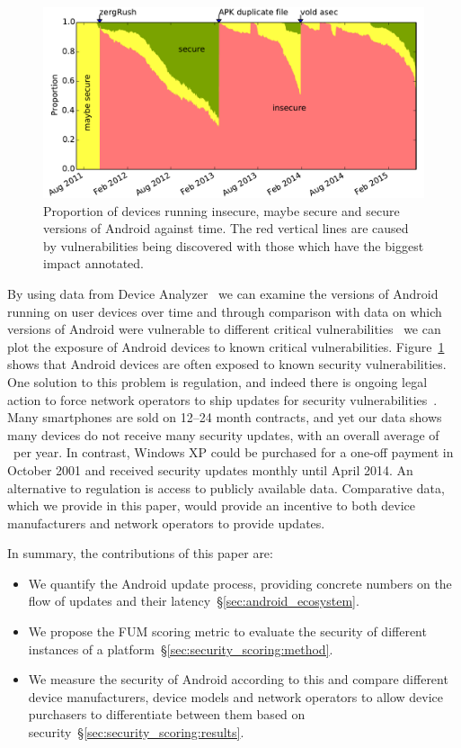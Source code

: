 \documentclass{sig-alternate}
\let\OldTodo\todo
\renewcommand{\todo}{\OldTodo[inline]}
\newcommand{\todolater}[1]{}%
\newcommand{\da}{Device Analyzer}
\begin{document}
\begin{figure}
\centering
\includegraphics[width=\columnwidth]{figures/proportioninsecure}
\caption{Proportion of devices running insecure, maybe secure and secure versions of Android against time.
The red vertical lines are caused by vulnerabilities being discovered with those which have the biggest impact annotated.
}
\label{fig:proportioninsecure}
\end{figure}
By using data from \da~\cite{Wagner2013} we can examine the versions of Android running on user devices over time and through comparison with data on which versions of Android were vulnerable to different critical vulnerabilities~\cite{androidvulnerabilities.org} we can plot the exposure of Android devices to known critical vulnerabilities.
Figure~\ref{fig:proportioninsecure} shows that Android devices are often exposed to known security vulnerabilities.
One solution to this problem is regulation, and indeed there is ongoing legal action to force network operators to ship updates for security vulnerabilities~\cite{Soghoian2013}.\todolater{Check on the status of this legal action}
Many smartphones are sold on 12--24 month contracts, and yet our data shows many devices do not receive many security updates, with an overall average of \daUpdatesPerYearNominal\ per year. 
In contrast, Windows XP could be purchased for a one-off payment in October 2001 and received security updates monthly until April 2014.
An alternative to regulation is access to publicly available data.
Comparative data, which we provide in this paper, would provide an incentive to both device manufacturers and network operators to provide updates.

In summary, the contributions of this paper are:
\begin{itemize}
 \item We quantify the Android update process, providing concrete numbers on the flow of updates and their latency~\S\ref{sec:android_ecosystem}.
 \item We propose the FUM scoring metric to evaluate the security of different instances of a platform~\S\ref{sec:security_scoring:method}.
 \item We measure the security of Android according to this and compare different device manufacturers, device models and network operators to allow device purchasers to differentiate between them based on security~\S\ref{sec:security_scoring:results}.
\end{itemize}
\end{document}
